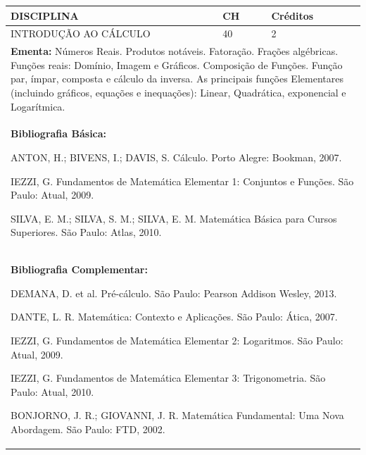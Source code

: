 \documentclass[a4paper, 12pt, openright, oneside, german, french, english, brazil]{abntex2}
\begin{document}
\begin{table}[!h]
  \footnotesize
  \centering
  \begin{tabular}{|p{100mm}|p{10mm}|p{20mm}|}
    \hline
    \textbf{DISCIPLINA} & \textbf{CH} & \textbf{Créditos} \\
    \hline
    INTRODUÇÃO AO CÁLCULO & 40 & 2 \\
    \hline
    \multicolumn{3}{|p{130mm}|}{\textbf{Ementa:} Números Reais. Produtos notáveis. Fatoração. Frações algébricas. Funções reais: Domínio, Imagem e Gráficos. Composição de Funções. Função par, ímpar, composta e cálculo da inversa. As principais funções Elementares (incluindo gráficos, equações e inequações): Linear, Quadrática, exponencial e Logarítmica.} \\
    \hline
    \multicolumn{3}{|p{130mm}|}{\textbf{Bibliografia Básica:}

    ANTON, H.; BIVENS, I.; DAVIS, S. Cálculo. Porto Alegre: Bookman, 2007.

IEZZI, G. Fundamentos de Matemática Elementar 1: Conjuntos e Funções. São Paulo: Atual, 2009.

SILVA, E. M.; SILVA, S. M.; SILVA, E. M. Matemática Básica para Cursos Superiores. São Paulo: Atlas, 2010.
} \\
    \hline
    \multicolumn{3}{|p{130mm}|}{\textbf{Bibliografia Complementar:}

    DEMANA, D. et al. Pré-cálculo. São Paulo: Pearson Addison Wesley, 2013.

DANTE, L. R. Matemática: Contexto e Aplicações. São Paulo: Ática, 2007.

IEZZI, G. Fundamentos de Matemática Elementar 2: Logaritmos. São Paulo: Atual, 2009.

IEZZI, G. Fundamentos de Matemática Elementar 3: Trigonometria. São Paulo: Atual,
2010.

BONJORNO, J. R.; GIOVANNI, J. R. Matemática Fundamental: Uma Nova Abordagem.
São Paulo: FTD, 2002.
} \\
    \hline
  \end{tabular}
\end{table}
\end{document}
